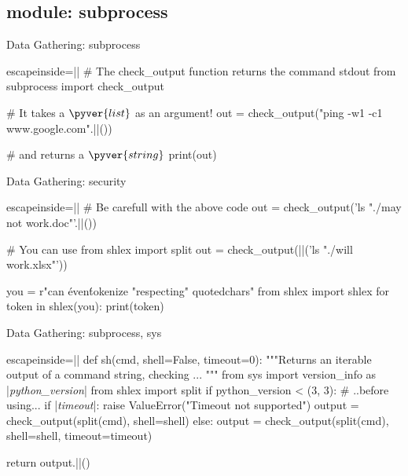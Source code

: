 \subsection{module: subprocess}
\begin{pyframe}{Data Gathering: subprocess}

%

\begin{pycode*}{escapeinside=||}
# The check_output function returns the command stdout
from subprocess import check_output

# It takes a $\pyver{list}$ as an argument!
out = check_output("ping -w1 -c1 www.google.com".||())

# and returns a $\pyver{string}$
print(out)
\end{pycode*}
\end{pyframe}

\begin{pyframe}{Data Gathering: security}
\begin{pycode*}{escapeinside=||}
# Be carefull with the above code
out = check_output('ls "./may not work.doc"'.||())

# You can use
from shlex import split
out = check_output(||('ls "./will work.xlsx"'))

you = r"can \'even\' tokenize "respecting" quoted\n chars"
from shlex import shlex
for token in shlex(you):
    print(token)

\end{pycode*}
\end{pyframe}

\begin{pyframe}{Data Gathering: subprocess, sys}
\begin{pycode*}{escapeinside=||}
def sh(cmd, shell=False, timeout=0):
  """Returns an iterable output of a command string, checking ... """
  from sys import version_info as |\emph{python\_version}|
  from shlex import split
  if python_version < (3, 3): # ..before using...
    if |\emph{timeout}|:
      raise ValueError("Timeout not supported")
    output = check_output(split(cmd), shell=shell)
  else:
    output = check_output(split(cmd), shell=shell, timeout=timeout)

  return output.||()
  
    
    
\end{pycode*}
\end{pyframe}


